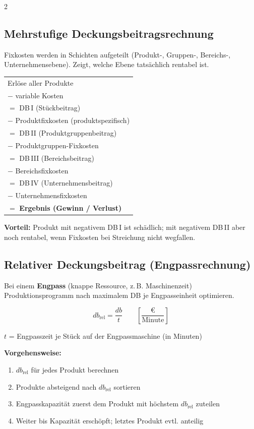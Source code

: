 \documentclass[10pt,a4paper]{article}
\begin{document}
\begin{multicols}{2}
\columnbreak

\subsection{Mehrstufige Deckungsbeitragsrechnung}

Fixkosten werden in Schichten aufgeteilt (Produkt-, Gruppen-, Bereichs-, Unternehmensebene). Zeigt, welche Ebene tatsächlich rentabel ist.

\begin{formelbox}
\renewcommand{\arraystretch}{1.15}
\begin{tabular}{@{}l@{}}
Erlöse aller Produkte \\
$-$ variable Kosten \\
\hline
$=$ DB\,I (Stückbeitrag) \\
$-$ Produktfixkosten (produktspezifisch) \\
\hline
$=$ DB\,II (Produktgruppenbeitrag) \\
$-$ Produktgruppen-Fixkosten \\
\hline
$=$ DB\,III (Bereichsbeitrag) \\
$-$ Bereichsfixkosten \\
\hline
$=$ DB\,IV (Unternehmensbeitrag) \\
$-$ Unternehmensfixkosten \\
\hline
$=$ \textbf{Ergebnis (Gewinn / Verlust)} \\
\end{tabular}
\end{formelbox}

\textbf{Vorteil:} Produkt mit negativem DB\,I ist schädlich; mit negativem DB\,II aber noch rentabel, wenn Fixkosten bei Streichung nicht wegfallen.

\subsection{Relativer Deckungsbeitrag (Engpassrechnung)}

Bei einem \textbf{Engpass} (knappe Ressource, z.\,B. Maschinenzeit) Produktionsprogramm nach maximalem DB je Engpasseinheit optimieren.

\begin{formelbox}
\[
db_{\text{rel}} = \frac{db}{t} \qquad \left[\frac{\text{€}}{\text{Minute}}\right]
\]
\end{formelbox}

$t$ = Engpasszeit je Stück auf der Engpassmaschine (in Minuten)

\vspace{4pt}
\textbf{Vorgehensweise:}
\begin{enumerate}[noitemsep, leftmargin=*]
  \item $db_{\text{rel}}$ für jedes Produkt berechnen
  \item Produkte absteigend nach $db_{\text{rel}}$ sortieren
  \item Engpasskapazität zuerst dem Produkt mit höchstem $db_{\text{rel}}$ zuteilen
  \item Weiter bis Kapazität erschöpft; letztes Produkt evtl. anteilig
\end{enumerate}


\end{multicols}
\end{document}
